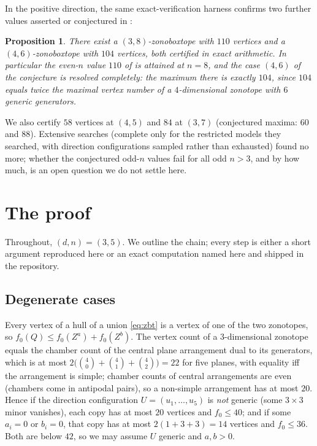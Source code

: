 \documentclass[11pt]{amsart}
\newtheorem{proposition}[theorem]{Proposition}
\theoremstyle{remark}
\begin{document}
In the positive direction, the same exact-verification harness confirms
two further values asserted or conjectured in \cite{BCLS}:

\begin{proposition}\label{prop:positive}
There exist a $(3,8)$-zonoboxtope with $110$ vertices and a
$(4,6)$-zonoboxtope with $104$ vertices, both certified in exact
arithmetic. In particular the even-$n$ value $110$ of
\cite[Conjecture 6.6]{BCLS} is attained at $n=8$, and the case $(4,6)$
of the conjecture is resolved completely: the maximum there is exactly
$104$, since $104$ equals twice the maximal vertex number of a
$4$-dimensional zonotope with $6$ generic generators.
\end{proposition}

We also certify $58$ vertices at $(4,5)$ and $84$ at $(3,7)$
(conjectured maxima: $60$ and $88$). Extensive searches (complete only
for the restricted models they searched, with direction configurations
sampled rather than exhausted) found no more; whether the conjectured
odd-$n$ values fail for all odd $n>3$, and by how much, is an open
question we do not settle here.

\section{The proof}\label{sec:architecture}

Throughout, $(d,n)=(3,5)$. We outline the chain; every step is either a
short argument reproduced here or an exact computation named here and
shipped in the repository.

\subsection{Degenerate cases}\label{sec:degenerate}
Every vertex of a hull of a union \eqref{eq:zbt} is a vertex of one of
the two zonotopes, so $f_0(Q)\le f_0(Z^a)+f_0(Z^b)$. The vertex count
of a $3$-dimensional zonotope equals the chamber count of the central
plane arrangement dual to its generators, which is at most
$2\bigl(\binom40+\binom41+\binom42\bigr)=22$ for five planes, with
equality iff the arrangement is simple; chamber counts of central
arrangements are even (chambers come in antipodal pairs), so a
non-simple arrangement has at most $20$. Hence if the direction
configuration $U=(u_1,\dots,u_5)$ is \emph{not} generic (some $3\times3$
minor vanishes), each copy has at most $20$ vertices and $f_0\le 40$;
and if some $a_i=0$ or $b_i=0$, that copy has at most
$2(1+3+3)=14$ vertices and $f_0\le 36$. Both are below $42$, so we may
assume $U$ generic and $a,b>0$.
\end{document}
